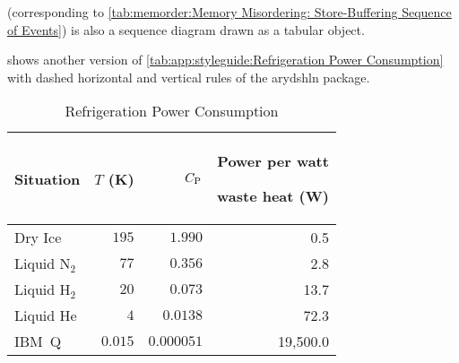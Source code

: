 (corresponding to
\cref{tab:memorder:Memory Misordering: Store-Buffering Sequence of Events})
is also a sequence diagram drawn as a tabular object.

\begin{table*}
\renewcommand*{\arraystretch}{1.1}
\small
\centering\OneColumnHSpace{-0.1in}
\caption{Memory Misordering: Store-Buffering Sequence of Events}
\label{tab:app:styleguide:Memory Misordering: Store-Buffering Sequence of Events}
\end{table*}

shows another version of
\cref{tab:app:styleguide:Refrigeration Power Consumption}
with dashed horizontal and vertical rules of the arydshln package.

\setlength\dashlinedash{.5pt}
\setlength\dashlinegap{1pt}

\begin{table}
\renewcommand*{\arraystretch}{1.2}\centering\small
\begin{tabular}{l:r:r:r}\toprule
Situation
	& $T$ (K)
		& $C_\mathrm{P}$ & \parbox[b]{.75in}{\raggedleft Power per watt\par waste heat (W)} \\
\hline
Dry Ice
	& $195$
		& $1.990$
			& 0.5 \\ \hdashline
Liquid N$_2$
	& $77$
		& $0.356$
			& 2.8 \\ \hdashline
Liquid H$_2$
	& $20$
		& $0.073$
			& 13.7 \\ \hdashline
Liquid He
	& $4$
		& $0.0138$
			& 72.3 \\ \hdashline
IBM~Q	& $0.015$
		& $0.000051$
			& 19,500.0 \\
\bottomrule
\end{tabular}
\caption{Refrigeration Power Consumption}
\label{tab:app:styleguide:Refrigeration Power Consumption (arydshln)}
\end{table}

